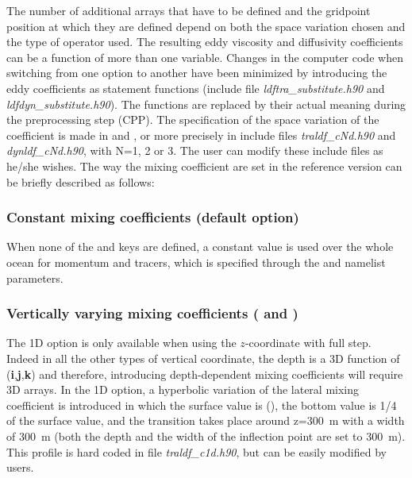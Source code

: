 \documentclass[../main/NEMO_manual]{subfiles}
\begin{document}
The number of additional arrays that have to be defined and the gridpoint position at which
they are defined depend on both the space variation chosen and the type of operator used.
The resulting eddy viscosity and diffusivity coefficients can be a function of more than one variable.
Changes in the computer code when switching from one option to another have been minimized by
introducing the eddy coefficients as statement functions
(include file \textit{ldftra\_substitute.h90} and \textit{ldfdyn\_substitute.h90}).
The functions are replaced by their actual meaning during the preprocessing step (CPP).
The specification of the space variation of the coefficient is made in  and ,
or more precisely in include files \textit{traldf\_cNd.h90} and \textit{dynldf\_cNd.h90}, with N=1, 2 or 3.
The user can modify these include files as he/she wishes.
The way the mixing coefficient are set in the reference version can be briefly described as follows:

\subsubsection{Constant mixing coefficients (default option)}
When none of the  and  keys are defined,
a constant value is used over the whole ocean for momentum and tracers,
which is specified through the  and  namelist parameters.

\subsubsection{Vertically varying mixing coefficients (\protect{} and )} 
The 1D option is only available when using the $z$-coordinate with full step.
Indeed in all the other types of vertical coordinate,
the depth is a 3D function of (\textbf{i},\textbf{j},\textbf{k}) and therefore,
introducing depth-dependent mixing coefficients will require 3D arrays.
In the 1D option, a hyperbolic variation of the lateral mixing coefficient is introduced in which
the surface value is  (), the bottom value is 1/4 of the surface value,
and the transition takes place around z=300~m with a width of 300~m
(\ie both the depth and the width of the inflection point are set to 300~m).
This profile is hard coded in file \textit{traldf\_c1d.h90}, but can be easily modified by users.
\end{document}
